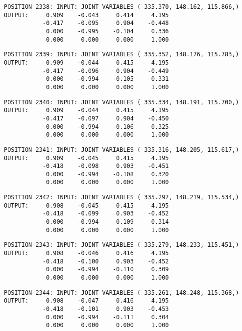 \begin{verbatim}
POSITION 2338: INPUT: JOINT VARIABLES ( 335.370, 148.162, 115.866,)
OUTPUT:     0.909    -0.043     0.414     4.195
           -0.417    -0.095     0.904    -0.448
            0.000    -0.995    -0.104     0.336
            0.000     0.000     0.000     1.000
\end{verbatim} \pagebreak[1]\begin{verbatim}
POSITION 2339: INPUT: JOINT VARIABLES ( 335.352, 148.176, 115.783,)
OUTPUT:     0.909    -0.044     0.415     4.195
           -0.417    -0.096     0.904    -0.449
            0.000    -0.994    -0.105     0.331
            0.000     0.000     0.000     1.000
\end{verbatim} \pagebreak[1]\begin{verbatim}
POSITION 2340: INPUT: JOINT VARIABLES ( 335.334, 148.191, 115.700,)
OUTPUT:     0.909    -0.044     0.415     4.195
           -0.417    -0.097     0.904    -0.450
            0.000    -0.994    -0.106     0.325
            0.000     0.000     0.000     1.000
\end{verbatim} \pagebreak[1]\begin{verbatim}
POSITION 2341: INPUT: JOINT VARIABLES ( 335.316, 148.205, 115.617,)
OUTPUT:     0.909    -0.045     0.415     4.195
           -0.418    -0.098     0.903    -0.451
            0.000    -0.994    -0.108     0.320
            0.000     0.000     0.000     1.000
\end{verbatim} \pagebreak[1]\begin{verbatim}
POSITION 2342: INPUT: JOINT VARIABLES ( 335.297, 148.219, 115.534,)
OUTPUT:     0.908    -0.045     0.415     4.195
           -0.418    -0.099     0.903    -0.452
            0.000    -0.994    -0.109     0.314
            0.000     0.000     0.000     1.000
\end{verbatim} \pagebreak[1]\begin{verbatim}
POSITION 2343: INPUT: JOINT VARIABLES ( 335.279, 148.233, 115.451,)
OUTPUT:     0.908    -0.046     0.416     4.195
           -0.418    -0.100     0.903    -0.452
            0.000    -0.994    -0.110     0.309
            0.000     0.000     0.000     1.000
\end{verbatim} \pagebreak[1]\begin{verbatim}
POSITION 2344: INPUT: JOINT VARIABLES ( 335.261, 148.248, 115.368,)
OUTPUT:     0.908    -0.047     0.416     4.195
           -0.418    -0.101     0.903    -0.453
            0.000    -0.994    -0.111     0.304
            0.000     0.000     0.000     1.000
\end{verbatim} \pagebreak[1]\begin{verbatim}

\end{verbatim}

